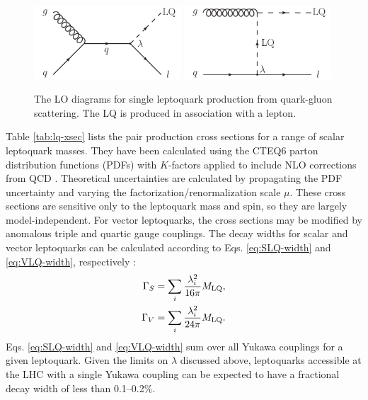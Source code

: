 \begin{figure}[hbt]
\begin{center}
\includegraphics[width=0.49\textwidth]{figures/LO_FD_single_LQ_a.pdf}
\includegraphics[width=0.49\textwidth]{figures/LO_FD_single_LQ_b.pdf}
\caption{The LO diagrams for single leptoquark production from quark-gluon scattering. The LQ is produced in association with a lepton.}
\label{fig:lq-single}
\end{center}
\end{figure}

Table \ref{tab:lq-xsec} lists the pair production cross sections for a range of scalar leptoquark masses. They have been calculated using the CTEQ6 parton distribution functions (PDFs) \cite{CTEQ6r1,CTEQ6r2} with $K$-factors applied to include NLO corrections from QCD \cite{LQxsec}. Theoretical uncertainties are calculated by propagating the PDF uncertainty and varying the factorization/renormalization scale $\mu$. These cross sections are sensitive only to the leptoquark mass and spin, so they are largely model-independent. For vector leptoquarks, the cross sections may be modified by anomalous triple and quartic gauge couplings. The decay widths for scalar and vector leptoquarks can be calculated according to Eqs. \eqref{eq:SLQ-width} and \eqref{eq:VLQ-width}, respectively \cite{BRW}:
\begin{align}
\label{eq:SLQ-width} \Gamma_{S} &= \sum_{i}{\frac{\lambda_{i}^{2}}{16\pi}M_{\text{LQ}}}, \\
\label{eq:VLQ-width} \Gamma_{V} &= \sum_{i}{\frac{\lambda_{i}^{2}}{24\pi}M_{\text{LQ}}}.
\end{align}
Eqs. \eqref{eq:SLQ-width} and \eqref{eq:VLQ-width} sum over all Yukawa couplings for a given leptoquark. Given the limits on $\lambda$ discussed above, leptoquarks accessible at the LHC with a single Yukawa coupling can be expected to have a fractional decay width of less than 0.1--0.2\%.

